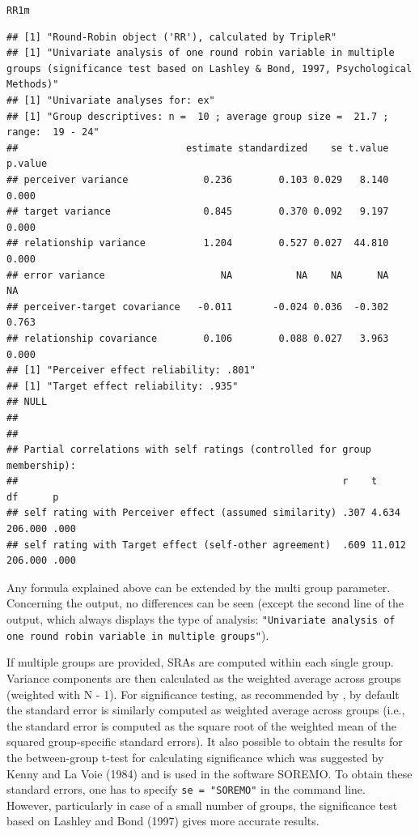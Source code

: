 \documentclass[a4paper]{article}\usepackage[]{graphicx}\usepackage[]{color}
\makeatletter
\newcommand{\hlstd}[1]{\textcolor[rgb]{0.345,0.345,0.345}{#1}}%
\newenvironment{kframe}{%
 \def\at@end@of@kframe{}%
 \ifinner\ifhmode%
  \def\at@end@of@kframe{\end{minipage}}%
  \begin{minipage}{\columnwidth}%
 \fi\fi%
 \def\FrameCommand##1{\hskip\@totalleftmargin \hskip-\fboxsep
 \colorbox{shadecolor}{##1}\hskip-\fboxsep
     \hskip-\linewidth \hskip-\@totalleftmargin \hskip\columnwidth}%
 \MakeFramed {\advance\hsize-\width
   \@totalleftmargin\z@ \linewidth\hsize
   \@setminipage}}%
 {\par\unskip\endMakeFramed%
 \at@end@of@kframe}
\newenvironment{knitrout}{}{} %
\makeatother
\begin{document}
\begin{knitrout}
\begin{kframe}
{\ttfamily\noindent\color{warningcolor}{\#\# Warning: ex :\ \ 4\ \ participant(s) have been excluded from group 20 due to exceedingly missing data; id(s) = 92002, 92009, 92013, 92019 .}}\begin{alltt}
\hlstd{RR1m}
\end{alltt}
\begin{verbatim}
## [1] "Round-Robin object ('RR'), calculated by TripleR"
## [1] "Univariate analysis of one round robin variable in multiple groups (significance test based on Lashley & Bond, 1997, Psychological Methods)"
## [1] "Univariate analyses for: ex"
## [1] "Group descriptives: n =  10 ; average group size =  21.7 ; range:  19 - 24"
##                             estimate standardized    se t.value p.value
## perceiver variance             0.236        0.103 0.029   8.140   0.000
## target variance                0.845        0.370 0.092   9.197   0.000
## relationship variance          1.204        0.527 0.027  44.810   0.000
## error variance                    NA           NA    NA      NA      NA
## perceiver-target covariance   -0.011       -0.024 0.036  -0.302   0.763
## relationship covariance        0.106        0.088 0.027   3.963   0.000
## [1] "Perceiver effect reliability: .801"
## [1] "Target effect reliability: .935"
## NULL
## 
## 
## Partial correlations with self ratings (controlled for group membership):
##                                                        r    t      df      p   
## self rating with Perceiver effect (assumed similarity) .307 4.634  206.000 .000
## self rating with Target effect (self-other agreement)  .609 11.012 206.000 .000
\end{verbatim}
\end{kframe}
\end{knitrout}


Any formula explained above can be extended by the multi group parameter. Concerning the output, no differences can be seen (except the second line of the output, which always displays the type of analysis: \texttt{"Univariate analysis of one round robin variable in multiple groups"}). 

If multiple groups are provided, SRAs are computed within each single group. Variance components are then calculated as the weighted average across groups (weighted with N - 1). For significance testing, as recommended by , by default the standard error is similarly computed as weighted average across groups (i.e., the standard error is computed as the square root of the weighted mean of the squared group-specific standard errors). It also possible to obtain the results for the between-group t-test for calculating significance which was suggested by Kenny and La Voie (1984) and is used in the software SOREMO. To obtain these standard errors, one has to specify \texttt{se = "SOREMO"} in the command line. However, particularly in case of a small number of groups, the significance test based on Lashley and Bond (1997) gives more accurate results.
\end{document}
